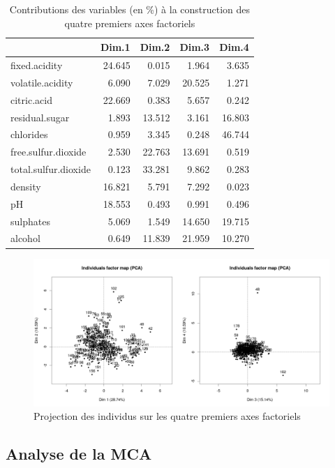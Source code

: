 \documentclass[11pt,a4paper]{article}
\begin{document}
\begin{table}[h]
	\centering
	\begin{tabular}{lrrrr}
		\hline
		& Dim.1 & Dim.2 & Dim.3 & Dim.4 \\ 
		\hline
		fixed.acidity & 24.645 & 0.015 & 1.964 & 3.635 \\ 
		volatile.acidity & 6.090 & 7.029 & 20.525 & 1.271 \\ 
		citric.acid & 22.669 & 0.383 & 5.657 & 0.242 \\ 
		residual.sugar & 1.893 & 13.512 & 3.161 & 16.803 \\ 
		chlorides & 0.959 & 3.345 & 0.248 & 46.744 \\ 
		free.sulfur.dioxide & 2.530 & 22.763 & 13.691 & 0.519 \\ 
		total.sulfur.dioxide & 0.123 & 33.281 & 9.862 & 0.283 \\ 
		density & 16.821 & 5.791 & 7.292 & 0.023 \\ 
		pH & 18.553 & 0.493 & 0.991 & 0.496 \\ 
		sulphates & 5.069 & 1.549 & 14.650 & 19.715 \\ 
		alcohol & 0.649 & 11.839 & 21.959 & 10.270 \\ 
		\hline
	\end{tabular}
\caption{Contributions des variables (en \%) à la construction des quatre premiers axes factoriels }
\label{table:pcacontrib}
\end{table}

\begin{figure}[h]
	\includegraphics[width=\textwidth, keepaspectratio]{pcaind}
	\caption{Projection des individus sur les quatre premiers axes factoriels}
	\label{fig:pcaind}
\end{figure}
\FloatBarrier
\subsection{Analyse de la MCA}
\end{document}
